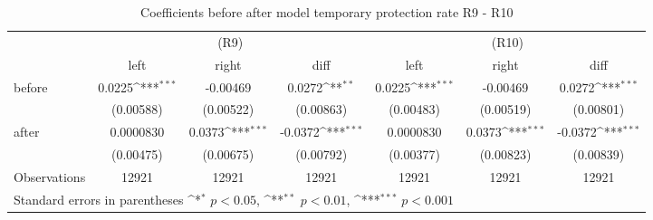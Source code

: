 \begin{table}[!ht]\centering \footnotesize
\def\sym#1{\ifmmode^{#1}\else\(^{#1}\)\fi}
\caption{Coefficients before after model temporary protection rate R9 - R10}
\begin{tabular}{l*{6}{c}}
\hline\hline
                    &\multicolumn{3}{c}{(R9)}&\multicolumn{3}{c}{(R10)}\\
&\multicolumn{1}{c}{left}&\multicolumn{1}{c}{right}&\multicolumn{1}{c}{diff}&\multicolumn{1}{c}{left}&\multicolumn{1}{c}{right}&\multicolumn{1}{c}{diff}\\
\hline
before              &      0.0225\sym{***}&    -0.00469         &      0.0272\sym{**} &      0.0225\sym{***}&    -0.00469         &      0.0272\sym{***}\\
                    &   (0.00588)         &   (0.00522)         &   (0.00863)         &   (0.00483)         &   (0.00519)         &   (0.00801)         \\
[0,5em]
after               &   0.0000830         &      0.0373\sym{***}&     -0.0372\sym{***}&   0.0000830         &      0.0373\sym{***}&     -0.0372\sym{***}\\
                    &   (0.00475)         &   (0.00675)         &   (0.00792)         &   (0.00377)         &   (0.00823)         &   (0.00839)         \\
\hline
Observations        &       12921         &       12921         &       12921         &       12921         &       12921         &       12921         \\
\hline\hline
\multicolumn{7}{l}{\footnotesize Standard errors in parentheses \sym{*} \(p<0.05\), \sym{**} \(p<0.01\), \sym{***} \(p<0.001\)}\\
\end{tabular}
\end{table}
